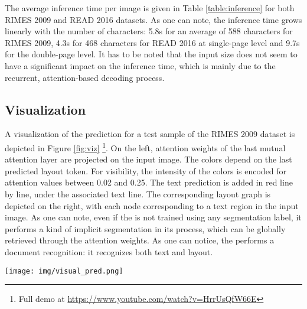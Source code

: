 The average inference time per image is given in Table \ref{table:inference} for both RIMES 2009 and READ 2016 datasets. As one can note, the inference time grows linearly with the number of characters: 5.8s for an average of 588 characters for RIMES 2009, 4.3s for 468 characters for READ 2016 at single-page level and 9.7s for the double-page level. It has to be noted that the input size does not seem to have a significant impact on the inference time, which is mainly due to the recurrent, attention-based decoding process.
\begin{table}[h!]
    \caption{Prediction using a single GPU V100 (32 Gb). Times and properties are averaged for a sample of the test set.}
    \centering
    \label{table:inference}
\end{table}

\subsection{Visualization}
A visualization of the prediction for a test sample of the RIMES 2009 dataset is depicted in Figure \ref{fig:viz} \footnote{Full demo at  \url{https://www.youtube.com/watch?v=HrrUsQfW66E}}. On the left, attention weights of the last mutual attention layer are projected on the input image. The colors depend on the last predicted layout token. For visibility, the intensity of the colors is encoded for attention values between 0.02 and 0.25. The text prediction is added in red line by line, under the associated text line. The corresponding layout graph is depicted on the right, with each node corresponding to a text region in the input image. As one can note, even if the \modelacc{} is not trained using any segmentation label, it performs a kind of implicit segmentation in its process, which can be globally retrieved through the attention weights. 
As one can notice, the \modelacc{} performs a document recognition: it recognizes both text and layout.
\begin{figure*}[ht]
    \centering
    \texttt{[image: img/visual\_pred.png]}
    \caption{Visualization of the prediction on a RIMES 2009 test sample. The DAN predicts both text (printed in red under each text line) and layout entities (depicted as a graph on the right). Attention weights are colored given the last predicted layout token.}
    \label{fig:viz}
\end{figure*}

